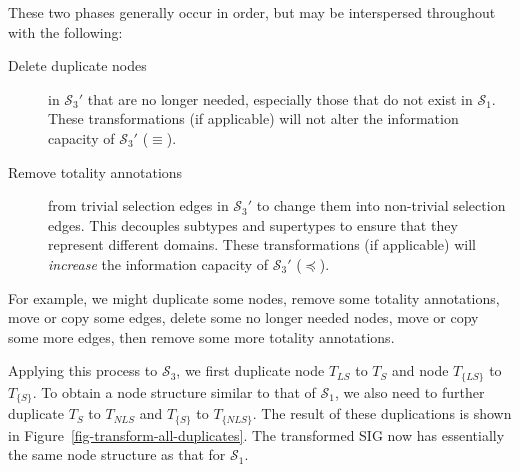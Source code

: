 \documentclass{sig-alternate-05-2015}
\newcommand{\LS}{\ensuremath{\mathit{LS}}}
\newcommand{\NLS}{\ensuremath{\mathit{NLS}}}
\newcommand{\T}[1]{\ensuremath{T_{#1}}}
\newcommand{\TT}[1]{\ensuremath{T_{\{#1\}}}}
\newcommand{\SC}[1]{\ensuremath{\mathcal{S}_{#1}}}
\begin{document}
These two phases generally occur in order, but may be interspersed throughout with the following:
\begin{description}

    \item[Delete duplicate nodes] in \(\SC{3}'\) that are no longer needed, especially those that do not exist in \(\SC{1}\). These transformations (if applicable) will not alter the information capacity of \(\SC{3}'\) (\(\equiv\)).
    
    \item[Remove totality annotations] from trivial selection edges in \(\SC{3}'\) to change them into non-trivial selection edges. This decouples subtypes and supertypes to ensure that they represent different domains. These transformations (if applicable) will \emph{increase} the information capacity of \(\SC{3}'\) (\(\preceq\)).
    
\end{description}
For example, we might duplicate some nodes, remove some totality annotations, move or copy some edges, delete some no longer needed nodes, move or copy some more edges, then remove some more totality annotations.

Applying this process to \(\SC{3}\), we first duplicate node \(\T{\LS}\) to \(\T{S}\) and node \(\TT{\LS}\) to \(\TT{S}\). To obtain a node structure similar to that of \(\SC{1}\), we also need to further duplicate \(\T{S}\) to \(\T{\NLS}\) and \(\TT{S}\) to \(\TT{\NLS}\). The result of these duplications is shown in Figure~\ref{fig-transform-all-duplicates}. The transformed SIG now has essentially the same node structure as that for \(\SC{1}\).

\end{document}
